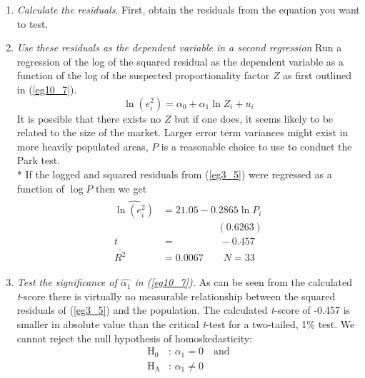 \documentclass[11pt]{article}
\begin{document}
\begin{enumerate}
\item \textit{Calculate the residuals}. First, obtain the residuals from the equation you want to test. 
\item \textit{Use these residuals as the dependent variable in a second regression} Run a regression of the log of the squared residual as the dependent variable as a function of the log of the suspected proportionality factor $Z$ as first outlined in (\ref{eg10_7}).
\begin{equation*}
\ln (e_i^2)=\alpha_0 +\alpha_1 \ln Z_i + u_i
\end{equation*}
It is possible that there exists no $Z$ but if one does, it seems likely to be related to the size of the market. Larger error term variances might exist in more heavily populated areas, $P$ is a reasonable choice to use to conduct the Park test.\\*
If the logged and squared residuals from (\ref{eg3_5}) were regressed as a function of $\log P$ then we get
\begin{align}
\label{eg10_8}
\begin{split}
\widehat{\ln (e_i^2)} &= 21.05 - {0.2865\ln P_i}\\
&\>\>\>\>\>\>\>\>\>\>\>\>\>\>\>\>\>\>\>\>\>\>\>\>\> (0.6263)\\
t&=\>\>\>\>\>\>\>\>\>\>\>\>\>\>\>\>\>\>\>\> -0.457\\
\bar{R^2}&= 0.0067 \quad\quad N=33
\end{split}
\end{align}
\item \textit{Test the significance of $\hat{\alpha_1}$ in (\ref{eg10_7}).} As can be seen from the calculated \textit{t}-score there is virtually no measurable relationship between the squared residuals of (\ref{eg3_5}) and the population. The calculated \textit{t}-score of -0.457 is smaller in absolute value than the critical \textit{t}-test for a two-tailed, 1\% test. We cannot reject the null hypothesis of homoskedasticity:
\begin{align*}
 \text{H}_0 &\text{: }\alpha_1 = 0 \quad \text{and} \\ \text{H}_\text{A}&\text{: } \alpha_1 \neq 0
\end{align*}
\end{enumerate}
\end{document}
